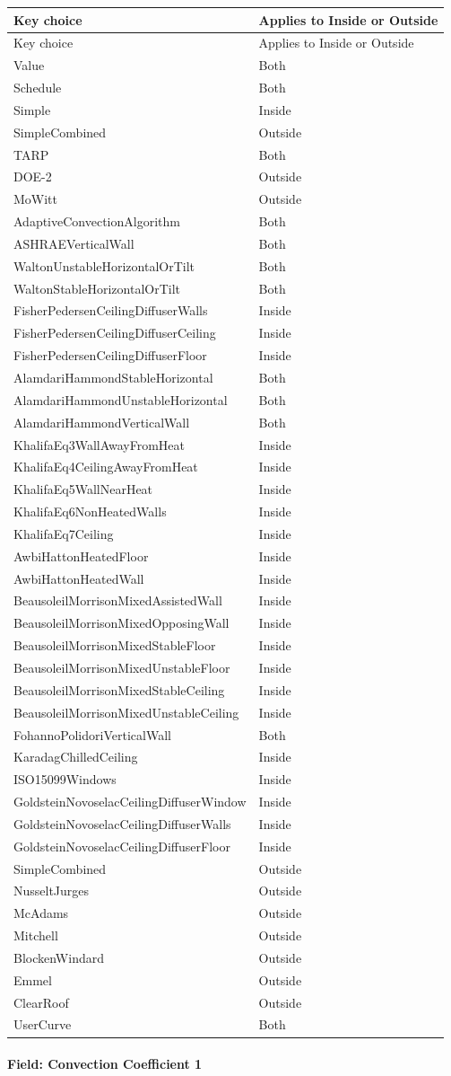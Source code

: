 \begin{longtable}[c]{p{3.49in}p{2.5in}}
\toprule
Key choice & Applies to Inside or Outside \tabularnewline
\midrule
\endfirsthead

\toprule
Key choice & Applies to Inside or Outside \tabularnewline
\midrule
\endhead

Value & Both \tabularnewline
Schedule & Both \tabularnewline
Simple & Inside \tabularnewline
SimpleCombined & Outside \tabularnewline
TARP & Both \tabularnewline
DOE-2 & Outside \tabularnewline
MoWitt & Outside \tabularnewline
AdaptiveConvectionAlgorithm & Both \tabularnewline
ASHRAEVerticalWall~~~ & Both \tabularnewline
WaltonUnstableHorizontalOrTilt & Both \tabularnewline
WaltonStableHorizontalOrTilt & Both \tabularnewline
FisherPedersenCeilingDiffuserWalls & Inside \tabularnewline
FisherPedersenCeilingDiffuserCeiling & Inside \tabularnewline
FisherPedersenCeilingDiffuserFloor & Inside \tabularnewline
AlamdariHammondStableHorizontal & Both \tabularnewline
AlamdariHammondUnstableHorizontal & Both \tabularnewline
AlamdariHammondVerticalWall & Both \tabularnewline
KhalifaEq3WallAwayFromHeat & Inside \tabularnewline
KhalifaEq4CeilingAwayFromHeat & Inside \tabularnewline
KhalifaEq5WallNearHeat & Inside \tabularnewline
KhalifaEq6NonHeatedWalls & Inside \tabularnewline
KhalifaEq7Ceiling & Inside \tabularnewline
AwbiHattonHeatedFloor & Inside \tabularnewline
AwbiHattonHeatedWall & Inside \tabularnewline
BeausoleilMorrisonMixedAssistedWall & Inside \tabularnewline
BeausoleilMorrisonMixedOpposingWall & Inside \tabularnewline
BeausoleilMorrisonMixedStableFloor & Inside \tabularnewline
BeausoleilMorrisonMixedUnstableFloor & Inside \tabularnewline
BeausoleilMorrisonMixedStableCeiling & Inside \tabularnewline
BeausoleilMorrisonMixedUnstableCeiling & Inside \tabularnewline
FohannoPolidoriVerticalWall~~~~~~ & Both \tabularnewline
KaradagChilledCeiling & Inside \tabularnewline
ISO15099Windows & Inside \tabularnewline
GoldsteinNovoselacCeilingDiffuserWindow & Inside \tabularnewline
GoldsteinNovoselacCeilingDiffuserWalls & Inside \tabularnewline
GoldsteinNovoselacCeilingDiffuserFloor & Inside \tabularnewline
SimpleCombined~~~~~ & Outside \tabularnewline
NusseltJurges & Outside \tabularnewline
McAdams & Outside \tabularnewline
Mitchell & Outside \tabularnewline
BlockenWindard & Outside \tabularnewline
Emmel & Outside \tabularnewline
ClearRoof & Outside \tabularnewline
UserCurve & Both \tabularnewline
\bottomrule
\end{longtable}

\paragraph{Field: Convection Coefficient 1}\label{field-convection-coefficient-1-1}

